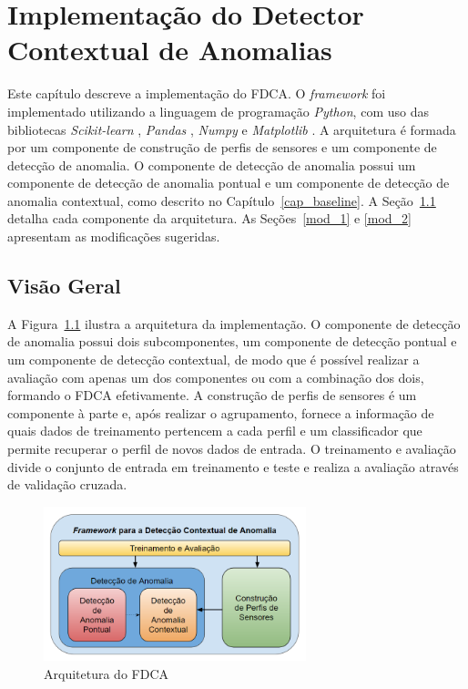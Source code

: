 \documentclass[cic,tc]{iiufrgs}
\begin{document}
\chapter{Implementação do Detector Contextual de Anomalias}
\label{implementacao}
Este capítulo descreve a implementação do FDCA. O \textit{framework} foi implementado utilizando a linguagem de programação \textit{Python}, com uso das bibliotecas \textit{Scikit-learn} \cite{scikit-learn}, \textit{Pandas} \cite{mckinney-proc-scipy-2010}, \textit{Numpy} \cite{walt2011numpy} e \textit{Matplotlib} \cite{hunter2007matplotlib}. A arquitetura é formada por um componente de construção de perfis de sensores e um componente de detecção de anomalia. O componente de detecção de anomalia possui um componente de detecção de anomalia pontual e um componente de detecção de anomalia contextual, como descrito no Capítulo~\ref{cap_baseline}. A Seção~\ref{imp_vis_geral} detalha cada componente da arquitetura. As Seções~\ref{mod_1} e \ref{mod_2} apresentam as modificações sugeridas.

\section{Visão Geral}
\label{imp_vis_geral}
A Figura~\ref{imp_arq} ilustra a arquitetura da implementação. O componente de detecção de anomalia possui dois subcomponentes, um componente de detecção pontual e um componente de detecção contextual, de modo que é possível realizar a avaliação com apenas um dos componentes ou com a combinação dos dois, formando o FDCA efetivamente. A construção de perfis de sensores é um componente à parte e, após realizar o agrupamento, fornece a informação de quais dados de treinamento pertencem a cada perfil e um classificador que permite recuperar o perfil de novos dados de entrada. O treinamento e avaliação divide o conjunto de entrada em treinamento e teste e realiza a avaliação através de validação cruzada.

\begin{figure}
	\caption{Arquitetura do FDCA}
	\bigskip
		\begin{center}
			\includegraphics[width=0.68\textwidth]{arq.png}
		\end{center}
	\label{imp_arq}
\end{figure}
\end{document}
